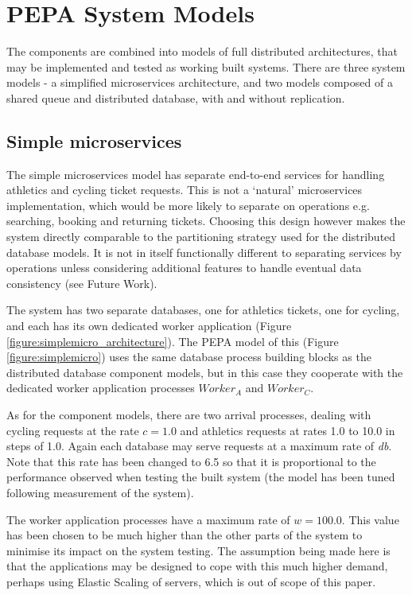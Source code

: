 %
%

\section{PEPA System Models}\label{sec:pepa-system-models}
The components are combined into models of full distributed architectures, that may be implemented and tested as working built systems.  There are three system models - a simplified microservices architecture, and two models composed of a shared queue and distributed database, with and without replication.

%
%
\FloatBarrier
\subsection{Simple microservices}

The simple microservices model has separate end-to-end services for handling athletics and cycling ticket requests.  This is not a `natural' microservices implementation, which would be more likely to separate on operations e.g. searching, booking and returning tickets.  Choosing this design however makes the system directly comparable to the partitioning strategy used for the distributed database models.  It is not in itself functionally different to separating services by operations unless considering additional features to handle eventual data consistency (see Future Work).

The system has two separate databases, one for athletics tickets, one for cycling, and each has its own dedicated worker application (Figure \ref{figure:simplemicro_architecture}).  The PEPA model of this (Figure \ref{figure:simplemicro}) uses the same database process building blocks as the distributed database component models, but in this case they cooperate with the dedicated worker application processes $\mathit{Worker_A}$ and $\mathit{Worker_C}$.

As for the component models, there are two arrival processes, dealing with cycling requests at the rate $\mathit{c=1.0}$ and athletics requests at rates 1.0 to 10.0 in steps of 1.0.  Again each database may serve requests at a maximum rate of {\itshape db}.  Note that this rate has been changed to 6.5 so that it is proportional to the performance observed when testing the built system (the model has been tuned following measurement of the system).

The worker application processes have a maximum rate of $\mathit{w=100.0}$.  This value has been chosen to be much higher than the other parts of the system to minimise its impact on the system testing.  The assumption being made here is that the applications may be designed to cope with this much higher demand, perhaps using Elastic Scaling of servers, which is out of scope of this paper.

